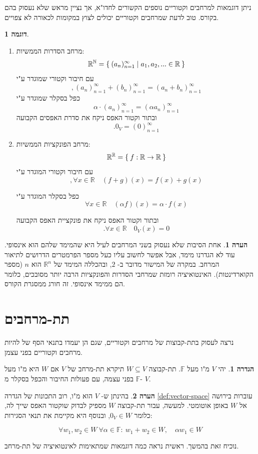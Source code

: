 \documentclass[12pt]{report}
\theoremstyle{plain}
\theoremstyle{definition}
\newtheorem{definition}[theorem]{הגדרה}
\newtheorem{example}{דוגמה}[chapter]
\newtheorem{remark}{הערה}[chapter]
\newcommand{\R}{\mathbb{R}}
\newcommand{\N}{\mathbb{N}}
\newcommand{\F}{\mathbb{F}}
\newcommand{\0}{\mathbf{0}}
\begin{document}
ניתן דוגמאות למרחבים וקטוריים נוספים הקשורים לחדו"א, אך נציין מראש שלא נעסוק בהם בקורס. טוב לדעת שמרחבים וקטוריים יכולים לצוץ במקומות לכאורה לא צפויים.

\begin{example}\
\begin{enumerate}[label=\alph*.]
\item 
מרחב הסדרות הממשיות:
$$
\R^{\N}=\Set{(a_n)_{n=1}^\infty|a_1,a_2,...\in\R}
$$
עם חיבור וקטורי שמוגדר ע"י
$$
,(a_n)_{n=1}^\infty+(b_n)_{n=1}^\infty=(a_n+b_n)_{n=1}^\infty
$$
כפל בסקלר שמוגדר ע"י
$$
\alpha\cdot(a_n)_{n=1}^\infty=(\alpha a_n)_{n=1}^\infty
$$
ובתור וקטור האפס ניקח את סדרת האפסים הקבועה
$$
.0_V=(0)_{n=1}^\infty
$$


\item 
מרחב הפונקציות הממשיות:
$$
\R^{\R}=\Set{f:\R\to\R}
$$
עם חיבור וקטורי המוגדר ע"י
$$
,\forall x\in\R \quad (f+g)(x)=f(x)+g(x)
$$

כפל בסקלר המוגדר ע"י
$$
\forall x\in\R \quad (\alpha f)(x)=\alpha\cdot f(x)
$$

ובתור וקטור האפס ניקח את פונקציית האפס הקבועה
$$
.\forall x\in\R \quad 0_V(x)=0
$$


\end{enumerate}
\end{example}

\begin{remark}
אחת הסיבות שלא נעסוק בשני המרחבים לעיל היא שהמימד שלהם הוא אינסופי. עוד לא הגדרנו מימד, אבל אפשר לחשוב עליו כעל מספר הפרמטרים הדרושים לתיאור המרחב. במקרה של המישור מדובר ב-
$2$,
ובהכללה המימד של
$\R^n$
הוא
$n$
(מספר הקוארדינטות).
האינטואיציה רומזת שמרחבי הסדרות והפונקציות הרבה יותר מסובכים, כלומר הם ממימד אינסופי. זה חורג ממסגרת הקורס.
\end{remark}

\section{תת-מרחבים}
נרצה לעסוק בתת-קבוצות של מרחבים וקטוריים, שגם הן יעמדו בתנאי הסף של להיות מרחבים וקטוריים בפני עצמן.

\begin{definition}
יהי 
$V$
מ"ו מעל
$\F$.
תת-קבוצה
$W\subseteq V$
תיקרא תת-מרחב של
$V$
אם
$W$
היא מ"ו מעל
$\F$
בפני עצמה,
עם פעולות החיבור והכפל בסקלר מ-
$V$.
\end{definition}

\begin{remark}
בהינתן ש-
$V$
הוא מ"ו, רוב התכונות של הגדרה
\ref{def:vector-space}
עוברות בירושה אל
$W$
באופן אוטומטי. למעשה, עבור תת-קבוצה 
$W$
מספיק לבדוק שוקטור האפס שייך לה, כלומר
$0_V\in W$,
ובנוסף היא מקיימת את תנאי הסגירות:

$$
\forall w_1,w_2\in W\ \forall \alpha\in\F:\ w_1+w_2\in W,\quad \alpha w_1\in W
$$

נוכיח זאת בהמשך. ראשית נראה כמה דוגמאות שמתאימות לאינטואיציה של תת-מרחב.
\end{remark}
\end{document}
